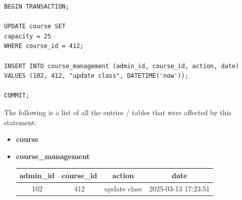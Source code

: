 \documentclass{report}
\makeatletter
\newenvironment{fullcenter}%
    {\@parboxrestore%
    \begin{adjustwidth}{}{\leftmargin}%
    \begin{center}%
    }{\end{center}%
    \end{adjustwidth}%
    }
\makeatother
\begin{document}
\begin{lstlisting}
BEGIN TRANSACTION;

UPDATE course SET
capacity = 25
WHERE course_id = 412;

INSERT INTO course_management (admin_id, course_id, action, date)
VALUES (102, 412, "update class", DATETIME('now'));

COMMIT;
\end{lstlisting}

The following is a list of all the entries / tables that were affected by this statement:

\begin{itemize}

    \item \textbf{course}
    \bigskip
    \begin{fullcenter}
    \end{fullcenter}

    \item \textbf{course\_management}
    \bigskip
    \begin{fullcenter}
        \begin{tabular}{| c | c | c | c |}
            \hline
            \textbf{admin\_id} & \textbf{course\_id} & \textbf{action} & \textbf{date} \\
            \hline
            102 & 412 & update class & 2025-03-13 17:23:51 \\
            \hline
        \end{tabular}
    \end{fullcenter}
    
\end{itemize}
\end{document}
